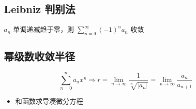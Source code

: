 \documentclass{article}
\begin{document}
\subsection{Leibniz 判别法}

$a_n$ 单调递减趋于零，则 $\sum_{n = 0}^{\infty} (-1)^n a_n$ 收敛

\subsection{幂级数收敛半径}

\begin{equation}
    \sum_{n = 0}^{\infty} a_n x^n \Rightarrow r = \lim_{n \to \infty} \frac{1}{\sqrt[n]{|a_n|}} = \lim_{n \to \infty} \frac{a_n}{a_{n+1}}
\end{equation}

\begin{itemize}
    \item 和函数求导凑微分方程
\end{itemize}
\end{document}
